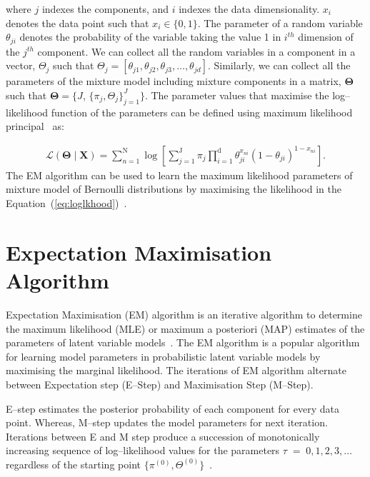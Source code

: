 where $j$ indexes the components,
and $i$ indexes the data dimensionality. $x_i$ denotes the data point 
such that $x_i \in \lbrace 0,1 \rbrace$. The parameter of a random variable $\theta_{ji}$  
denotes the probability of the variable taking the value 1 in $i^{th}$ 
dimension of the $j^{th}$ component. We can collect all the random 
variables in a component in a vector, $\Theta _j$ such that
$\Theta _j=[\theta_{j1},\theta_{j2},\theta_{j3}, \ldots, \theta_{jd}]$.
Similarly, we can collect all the parameters of the mixture model including mixture
components in a matrix, $\boldsymbol{\Theta}$ such
that $\boldsymbol{\Theta}=\{J$, $\{ \pi_j,\Theta_j\}_{j=1}^{J}\}$.
The parameter values that maximise the log--likelihood function 
of the parameters can be defined using 
maximum likelihood principal~\cite{bishop06} as:

\begin{eqnarray}
  \label{eq:loglkhood}
  \mathcal{L} (\boldsymbol{\Theta} \mid \boldsymbol{X}) =\displaystyle\sum_{n=1}^{\mathrm{N}} \log  \left [ \displaystyle\sum_{j=1}^{\mathrm{J}} \pi_j \displaystyle \prod _{i=1} ^{\mathrm{d}} \theta_{ji}^{x_{ni}} (1-\theta_{ji})^{1-x_{ni}} \right].
\end{eqnarray} 
The EM algorithm can be used to learn the maximum likelihood parameters 
of mixture model of Bernoulli  distributions by maximising the likelihood 
in the Equation~(\ref{eq:loglkhood})~\cite{wolfe70}. 

\section{Expectation Maximisation Algorithm}
\label{s:emalgo}
Expectation Maximisation (EM) algorithm is an iterative algorithm
to determine the maximum likelihood (MLE) or maximum a posteriori 
(MAP) estimates of the parameters of latent variable 
models~\cite{expectmax,McLachlan2008emext}. The EM algorithm is a 
popular algorithm for learning model parameters in probabilistic 
latent variable models by maximising the marginal likelihood. 
The iterations of EM algorithm alternate between Expectation 
step (E--Step) and Maximisation Step (M--Step).

E--step estimates the posterior probability of each component 
for every data point. Whereas, M--step updates the  model parameters 
for next iteration. 
Iterations between E and M step produce a succession 
of monotonically increasing sequence of log--likelihood values
for the parameters $\tau\;=\;0,1,2,3,\ldots$ regardless of 
the starting point $\{\pi^{(0)},\Theta^{(0)}\}$~\cite{McLachlan2008emext}. 


